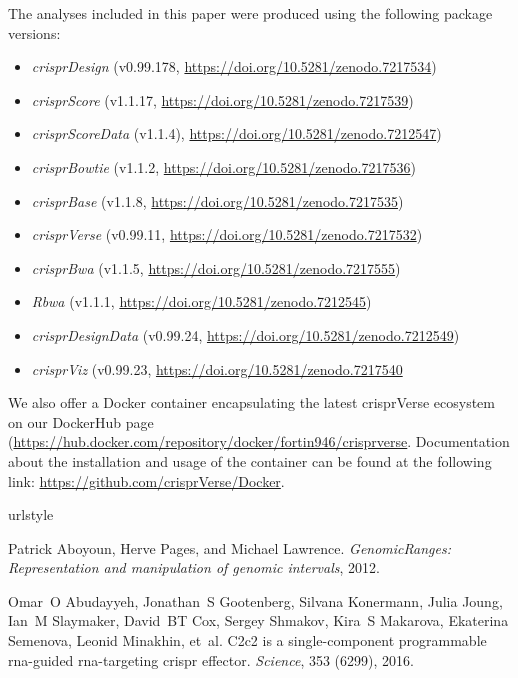 \documentclass[pdftex,english,10pt]{article}
\begin{document}
{The analyses included in this paper were produced using the following package versions: 
\begin{itemize}
\item \textit{crisprDesign} (v0.99.178, \url{https://doi.org/10.5281/zenodo.7217534})
\item \textit{crisprScore} (v1.1.17, \url{https://doi.org/10.5281/zenodo.7217539})
\item \textit{crisprScoreData} (v1.1.4), \url{https://doi.org/10.5281/zenodo.7212547})
\item \textit{crisprBowtie} (v1.1.2, \url{https://doi.org/10.5281/zenodo.7217536})
\item \textit{crisprBase} (v1.1.8, \url{https://doi.org/10.5281/zenodo.7217535})
\item \textit{crisprVerse} (v0.99.11, \url{https://doi.org/10.5281/zenodo.7217532})
\item \textit{crisprBwa} (v1.1.5, \url{https://doi.org/10.5281/zenodo.7217555})
\item \textit{Rbwa} (v1.1.1, \url{https://doi.org/10.5281/zenodo.7212545})
\item \textit{crisprDesignData} (v0.99.24, \url{https://doi.org/10.5281/zenodo.7212549})
\item \textit{crisprViz} (v0.99.23, \url{https://doi.org/10.5281/zenodo.7217540}
\end{itemize}

We also offer a Docker container encapsulating the latest crisprVerse ecosystem on our DockerHub page (\url{https://hub.docker.com/repository/docker/fortin946/crisprverse}. 
Documentation about the installation and usage of the container can be found at the following link: \url{https://github.com/crisprVerse/Docker}.



%
%

\begin{thebibliography}{105}
\providecommand{\natexlab}[1]{#1}
\providecommand{\url}[1]{\texttt{#1}}
\expandafter\ifx\csname urlstyle\endcsname\relax
  \providecommand{\doi}[1]{doi: #1}\else
  \providecommand{\doi}{doi: \begingroup \urlstyle{rm}\Url}\fi

Patrick Aboyoun, Herve Pages, and Michael Lawrence.
\newblock \emph{GenomicRanges: Representation and manipulation of genomic
  intervals}, 2012.

Omar~O Abudayyeh, Jonathan~S Gootenberg, Silvana Konermann, Julia Joung, Ian~M
  Slaymaker, David~BT Cox, Sergey Shmakov, Kira~S Makarova, Ekaterina Semenova,
  Leonid Minakhin, et~al.
\newblock C2c2 is a single-component programmable rna-guided rna-targeting
  crispr effector.
\newblock \emph{Science}, 353 (6299), 2016.


\end{thebibliography}}
\end{document}
